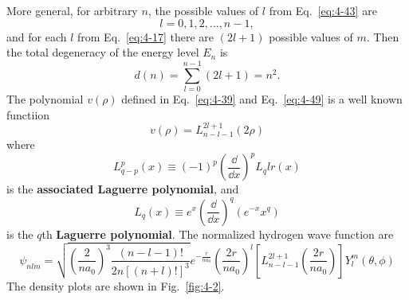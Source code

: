 More general, for arbitrary $n$, the possible values of $l$ from Eq.~\eqref{eq:4-43} are
\begin{equation}
  \label{eq:4-57}
  l = 0,1,2,\ldots, n-1,
\end{equation}
and for each $l$ from Eq.~\eqref{eq:4-17} there are $\left( 2l+1 \right)$ possible values of $m$.
Then the total degeneracy of the energy level $E_n$ is
\begin{equation}
  \label{eq:4-58}
  d \left( n \right) = \sum_{l=0}^{n-1} \left( 2l+1 \right) = n^{2}.
\end{equation}
The polynomial $v \left( \rho \right)$ defined in Eq.~\eqref{eq:4-39} and Eq.~\eqref{eq:4-49} is a well known functiion
\begin{equation}
  \label{eq:4-59}
  v \left( \rho \right) = L_{n-l-1}^{2l+1} \left( 2\rho \right)
\end{equation}
where
\begin{equation}
  \label{eq:4-60}
  L_{q-p}^p \left( x \right) \equiv \left( -1 \right)^p \left( \frac{\dd}{\dd x} \right)^p L_q lr(x)
\end{equation}
is the \textbf{associated Laguerre polynomial}, and
\begin{equation}
  \label{eq:4-61}
  L_q \left( x \right) \equiv e^x \left( \frac{\dd }{\dd x} \right)^q \left( e^{-x} x^q \right)
\end{equation}
is the $q$th \textbf{Laguerre polynomial}.
The normalized hydrogen wave function are
\begin{equation}
  \label{eq:4-62}
  \psi_{nlm} = \sqrt{ \left(\frac{2}{n a_{0}}\right)^{3} \frac{\left(n-l-1\right)!}{2n \left[\left(n+l\right)!\right]^3} } e^{- \frac{r}{n a_{0}}} \left( \frac{2r}{n a_{0}} \right)^l \left[ L_{n-l-1}^{2l+1} \left( \frac{2r}{na_{0}} \right) \right] Y_l^m \left( \theta,\phi \right)
\end{equation}
The density plots are shown in Fig.~\ref{fig:4-2}.
